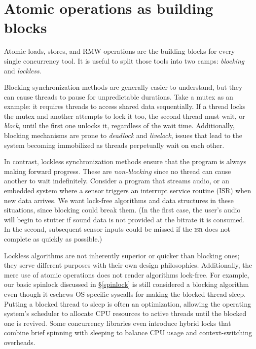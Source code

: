 \documentclass[fontsize=10pt, oneside]{scrartcl}
\newcommand{\introduce}[1]{\textit{#1}}
\newcommand{\secref}[1]{\hyperref[#1]{\textsc{\S}\ref*{#1}}}
\begin{document}
\section{Atomic operations as building blocks}

Atomic loads, stores, and \textsc{RMW} operations are the building blocks for every single concurrency tool.
It is useful to split those tools into two camps:
\introduce{blocking} and \introduce{lockless}.

Blocking synchronization methods are generally easier to understand,
but they can cause threads to pause for unpredictable durations.
Take a mutex as an example:
it requires threads to access shared data sequentially.
If a thread locks the mutex and another attempts to lock it too,
the second thread must wait, or \introduce{block},
until the first one unlocks it, regardless of the wait time.
Additionally, blocking mechanisms are prone to \introduce{deadlock} and \introduce{livelock},
issues that lead to the system becoming immobilized as threads perpetually wait on each other.

In contrast, lockless synchronization methods ensure that the program is always making forward progress.
These are \introduce{non-blocking} since no thread can cause another to wait indefinitely.
Consider a program that streams audio,
or an embedded system where a sensor triggers an interrupt service routine (\textsc{ISR}) when new data arrives.
We want lock-free algorithms and data structures in these situations,
since blocking could break them.
(In the first case, the user's audio will begin to stutter if sound data is not provided at the bitrate it is consumed.
In the second, subsequent sensor inputs could be missed if the \textsc{isr} does not complete as quickly as possible.)

\setcounter{footnote}{0}
Lockless algorithms are not inherently superior or quicker than blocking ones;
they serve different purposes with their own design philosophies.
Additionally, the mere use of atomic operations does not render algorithms lock-free.
For example, our basic spinlock discussed in \secref{spinlock} is still considered a blocking algorithm even though it eschews \textsc{OS}-specific syscalls for making the blocked thread sleep.
Putting a blocked thread to sleep is often an optimization,
allowing the operating system's scheduler to allocate \textsc{CPU} resources to active threads until the blocked one is revived.
Some concurrency libraries even introduce hybrid locks that combine brief spinning with sleeping to balance \textsc{CPU} usage and context-switching overheads.
\end{document}
